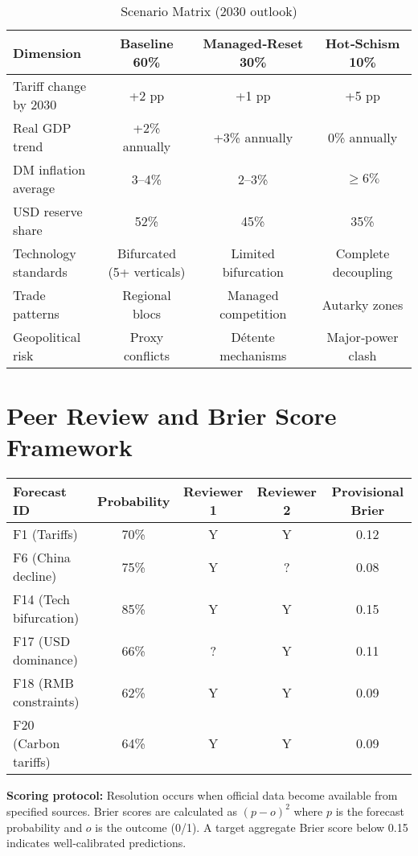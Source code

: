 \documentclass[12pt]{article}
\begin{document}
\begin{table}[ht]
\centering
\caption*{Scenario Matrix (2030 outlook)}
\small
\begin{tabular}{lccc}
\toprule
\textbf{Dimension} & \textbf{Baseline 60\%} & \textbf{Managed‑Reset 30\%} & \textbf{Hot‑Schism 10\%} \\
\midrule
Tariff change by 2030 & +2 pp & +1 pp & +5 pp \\
Real GDP trend & +2\% annually & +3\% annually & 0\% annually \\
DM inflation average & 3–4\% & 2–3\% & $\geq 6\%$ \\
USD reserve share & 52\% & 45\% & 35\% \\
Technology standards & Bifurcated (5+ verticals) & Limited bifurcation & Complete decoupling \\
Trade patterns & Regional blocs & Managed competition & Autarky zones \\
Geopolitical risk & Proxy conflicts & Détente mechanisms & Major‑power clash \\
\bottomrule
\end{tabular}
\end{table}

\section{Peer Review and Brier Score Framework}

\begin{table}[ht]
\centering
\begin{tabular}{|l|c|c|c|c|}
\hline
\textbf{Forecast ID} & \textbf{Probability} & \textbf{Reviewer 1} & \textbf{Reviewer 2} & \textbf{Provisional Brier} \\
\hline
F1 (Tariffs) & 70\% & Y & Y & 0.12 \\
F6 (China decline) & 75\% & Y & ? & 0.08 \\
F14 (Tech bifurcation) & 85\% & Y & Y & 0.15 \\
F17 (USD dominance) & 66\% & ? & Y & 0.11 \\
F18 (RMB constraints) & 62\% & Y & Y & 0.09 \\
F20 (Carbon tariffs) & 64\% & Y & Y & 0.09 \\
\hline
\end{tabular}
\end{table}

\textbf{Scoring protocol:} Resolution occurs when official data become available from specified sources.  Brier scores are calculated as $(p - o)^2$ where $p$ is the forecast probability and $o$ is the outcome (0/1).  A target aggregate Brier score below 0.15 indicates well‑calibrated predictions.
\end{document}
